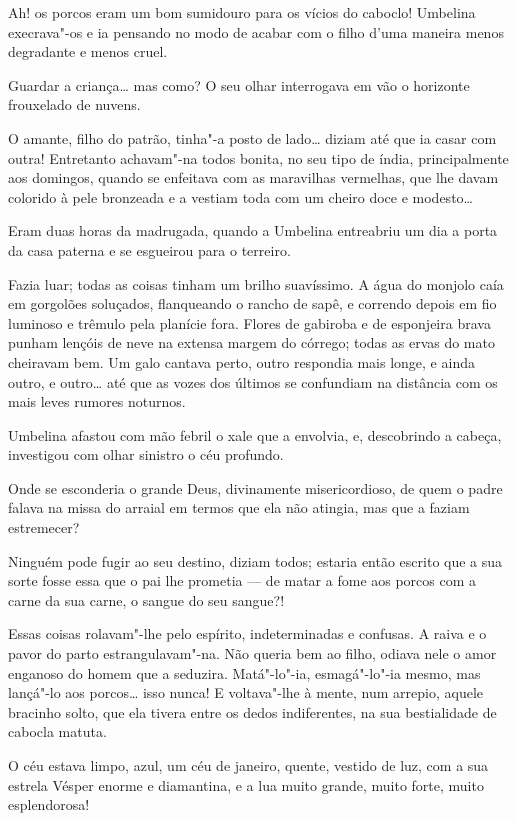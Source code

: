 Ah! os porcos eram um bom sumidouro para os vícios do caboclo! Umbelina
execrava"-os e ia pensando no modo de acabar com o filho d'uma maneira
menos degradante e menos cruel.

Guardar a criança\ldots{} mas como? O seu olhar interrogava em vão o
horizonte frouxelado de nuvens.

O amante, filho do patrão, tinha"-a posto de lado\ldots{} diziam até que ia
casar com outra! Entretanto achavam"-na todos bonita, no seu tipo de
índia, principalmente aos domingos, quando se enfeitava com as
maravilhas vermelhas, que lhe davam colorido à pele bronzeada e a
vestiam toda com um cheiro doce e modesto\ldots{}

Eram duas horas da madrugada, quando a Umbelina entreabriu um dia a
porta da casa paterna e se esgueirou para o terreiro.

Fazia luar; todas as coisas tinham um brilho suavíssimo. A água do
monjolo caía em gorgolões soluçados, flanqueando o rancho de sapê, e
correndo depois em fio luminoso e trêmulo pela planície fora. Flores de
gabiroba e de esponjeira brava punham lençóis de neve na extensa margem
do córrego; todas as ervas do mato cheiravam bem. Um galo cantava perto,
outro respondia mais longe, e ainda outro, e outro\ldots{} até que as vozes
dos últimos se confundiam na distância com os mais leves rumores
noturnos.

Umbelina afastou com mão febril o xale que a envolvia, e, descobrindo a
cabeça, investigou com olhar sinistro o céu profundo.

Onde se esconderia o grande Deus, divinamente misericordioso, de quem o
padre falava na missa do arraial em termos que ela não atingia, mas que
a faziam estremecer?

Ninguém pode fugir ao seu destino, diziam todos; estaria então escrito
que a sua sorte fosse essa que o pai lhe prometia --- de matar a fome
aos porcos com a carne da sua carne, o sangue do seu sangue?!

Essas coisas rolavam"-lhe pelo espírito, indeterminadas e confusas. A
raiva e o pavor do parto estrangulavam"-na. Não queria bem ao filho,
odiava nele o amor enganoso do homem que a seduzira. Matá"-lo"-ia,
esmagá"-lo"-ia mesmo, mas lançá"-lo aos porcos\ldots{} isso nunca! E voltava"-lhe
à mente, num arrepio, aquele bracinho solto, que ela tivera entre os
dedos indiferentes, na sua bestialidade de cabocla matuta.

O céu estava limpo, azul, um céu de janeiro, quente, vestido de luz, com
a sua estrela Vésper enorme e diamantina, e a lua muito grande, muito
forte, muito esplendorosa!

